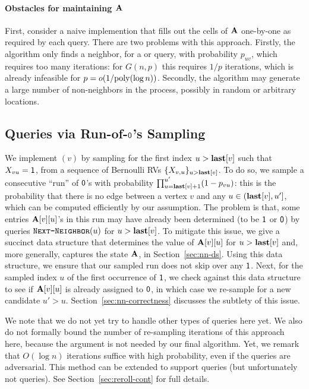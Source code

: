 \paragraph*{Obstacles for maintaining $\mathbf{A}$}
First, consider a naive implemention that fills out the cells of $\mathbf{A}$ one-by-one as required by each query.
There are two problems with this approach.
Firstly, the algorithm only finds a neighbor, for a  or  query, with probability $p_{uv}$,
which requires too many iterations: for $G(n,p)$ this requires $1/p$ iterations, which is already infeasible for $p = o(1/\mathrm{poly}(\log n))$.
Secondly, the algorithm may generate a large number of non-neighbors in the process, possibly in random or arbitrary locations.




\subsection{ Queries via Run-of-$\mathsf{0}$'s Sampling}\label{sec:ER-rand}

We implement $(v)$ by sampling for the first index $u > \mathbf{last}[v]$ such that $X_{vu}=\mathsf{1}$,
from a sequence of Bernoulli RVs $\{X_{v, u}\}_{u > \mathbf{last}[v]}$.
To do so, we sample a consecutive ``run'' of $\mathsf{0}$'s with probability $\prod_{u=\mathbf{last}[v]+1}^{u'} (1-p_{vu})$:
this is the probability that there is no edge between a vertex $v$ and any $u \in (\mathbf{last}[v],u']$, which can be computed efficiently by our assumption.
The problem is that, some entries $\mathbf{A}[v][u]$'s in this run may have already been determined (to be $\mathsf{1}$ or $\mathsf{0}$)
by queries $\texttt{\textsc{Next-Neighbor}}(u)$ for $u > \mathbf{last}[v]$.
To mitigate this issue, we give a succinct data structure that determines the value of $\mathbf{A}[v][u]$ for $u >\mathbf{last}[v]$ and,
more generally, captures the state $\mathbf{A}$, in Section~\ref{sec:nn-ds}.
Using this data structure, we ensure that our sampled run does not skip over any $\mathsf{1}$.
Next, for the sampled index $u$ of the first occurrence of $\mathsf{1}$,
we check against this data structure to see if $\mathbf{A}[v][u]$ is already assigned to $\mathsf{0}$, in which case we re-sample for a new candidate $u' > u$.
Section~\ref{sec:nn-correctness} discusses the subtlety of this issue.

We note that we do not yet try to handle other types of queries here yet.
We also do not formally bound the number of re-sampling iterations of this approach here, because the argument is not needed by our final algorithm.
Yet, we remark that $O(\log n)$ iterations suffice with high probability, even if the queries are adversarial.
This method can be extended to support  queries (but unfortunately not  queries).
See Section~\ref{sec:reroll-cont} for full details.

